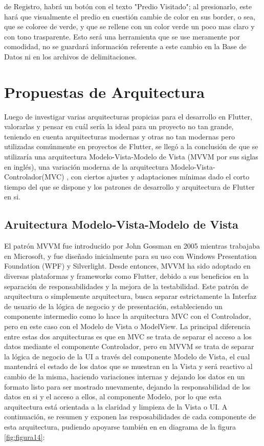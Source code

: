 \begin{itemize}
\begin{itemize}
                    de Registro, habrá un botón con el texto "Predio Visitado"; al presionarlo, este hará que visualmente el predio en cuestión cambie de color en sus border, o sea, que se coloree
                    de verde, y que se rellene con un color verde un poco mas claro y con tono trasparente. Esto será una herramienta que se use meramente por comodidad, no se guardará información
                    referente a este cambio en la Base de Datos ni en los archivos de delimitaciones.
          \end{itemize}

\end{itemize}
\section{Propuestas de Arquitectura}
Luego de investigar varias arquitecturas propicias para el desarrollo en Flutter, valorarlas y pensar en cuál sería la ideal para un proyecto no tan grande,
teniendo en cuenta arquitecturas modernas y otras no tan modernas pero utilizadas comúnmente en proyectos de Flutter, se llegó a la conclusión de que se utilizaría
una arquitectura Modelo-Vista-Modelo de Vista (MVVM por sus siglas en inglés)\cite{MVVM}, una variación moderna de la arquitectura Modelo-Vista-Controlador(MVC) \cite{MVC},
con ciertos ajustes y adaptaciones mínimas dado el corto tiempo del que se dispone y los patrones de desarrollo y arquitectura de Flutter en si.
\subsection{Aruitectura Modelo-Vista-Modelo de Vista}
El patrón MVVM fue introducido por John Gossman en 2005 mientras trabajaba en Microsoft, y fue diseñado inicialmente para su uso
con Windows Presentation Foundation (WPF) y Silverlight. Desde entonces, MVVM ha sido adoptado en diversas plataformas y frameworks como Flutter,
debido a sus beneficios en la separación de responsabilidades y la mejora de la testabilidad.
Este patrón de arquitectura o simplemente arquitectura, busca separar estrictamente la Interfaz de usuario de la lógica de negocio y de presentación, estableciendo un componente
intermedio como lo hace la arquitectura MVC con el Controlador, pero en este caso con el Modelo de Vista o ModelView. La principal diferencia entre estas dos arquitecturas
es que en MVC se trata de separar el acceso a los datos mediante el componente Controlador, pero en MVVM se trata de separar la lógica de negocio de la UI a través del componente
Modelo de Vista, el cual mantendrá el estado de los datos que se muestran en la Vista y será reactivo al cambio de la misma, haciendo variaciones internas y dejando los datos en
un formato listo para ser mostrado nuevamente, dejando la responsabilidad de los datos en si y el acceso a ellos, al componente Modelo, por lo que esta arquitectura está orientada
a la claridad y limpieza de la Vista o UI. A continuación, se resumen y exponen las resposabilidades de cada componente de esta arquitectura, pudiendo apoyarse también en en diagrama
de la figura \ref{fig:figura14}:

